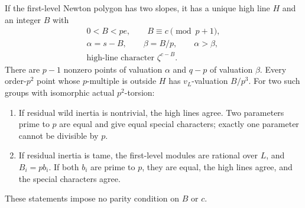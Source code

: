 \begin{lemma}
\label{lem:B-RD69-rules}
If the first-level Newton polygon has two slopes, it has a
unique high line \(H\) and an integer \(B\) with
\[
 \begin{gathered}
 0<B<pe,\qquad B\equiv c\pmod{p+1},\\
 \alpha=s-B,\qquad \beta=B/p,\qquad \alpha>\beta,\\
 \text{high-line character }\zeta^{c-B}.
 \end{gathered}
 \tag{B-RD69.2}
\]
There are \(p-1\) nonzero points of valuation \(\alpha\) and
\(q-p\) of valuation \(\beta\). Every order-\(p^2\) point whose
\(p\)-multiple is outside \(H\) has \(v_L\)-valuation \(B/p^3\).
For two such groups with isomorphic actual \(p^2\)-torsion:

\begin{enumerate}
\item If residual wild inertia is nontrivial, the high lines
agree. Two parameters prime to \(p\) are equal and give equal
special characters; exactly one parameter cannot be divisible
by \(p\).
\item If residual inertia is tame, the first-level modules are
rational over \(L\), and \(B_i=pb_i\). If both \(b_i\) are prime
to \(p\), they are equal, the high lines agree, and the special
characters agree.
\end{enumerate}
These statements impose no parity condition on \(B\) or \(c\).
\end{lemma}

